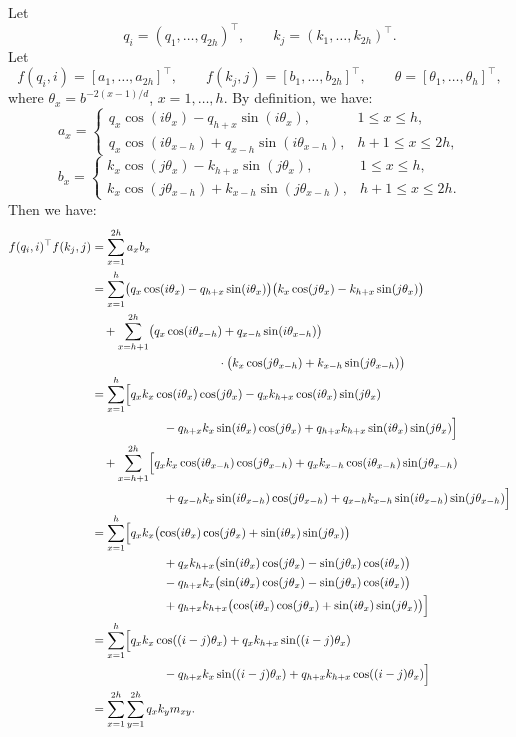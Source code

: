 \documentclass[11pt,a4paper]{article}
\begin{document}
Let
\[
q_i=(q_1,\ldots,q_{2h})^\top,\qquad
k_j=(k_1,\ldots,k_{2h})^\top.
\]
Let
\[
f(q_i,i)=[a_1,\ldots,a_{2h}]^\top,\qquad
f(k_j,j)=[b_1,\ldots,b_{2h}]^\top,\qquad
\theta=[\theta_1,\ldots,\theta_h]^\top,
\]
where \(\theta_x=b^{-2(x-1)/d}\), \(x=1,\ldots,h\).
By definition, we have:
\[
a_x=
\begin{cases}
q_x\cos(i\theta_x)-q_{h+x}\sin(i\theta_x),
& 1\le x\le h,\\
q_x\cos(i\theta_{x-h})+q_{x-h}\sin(i\theta_{x-h}),
& h+1\le x\le 2h,
\end{cases}
\]
\[
b_x=
\begin{cases}
k_x\cos(j\theta_x)-k_{h+x}\sin(j\theta_x),
& 1\le x\le h,\\
k_x\cos(j\theta_{x-h})+k_{x-h}\sin(j\theta_{x-h}),
& h+1\le x\le 2h.
\end{cases}
\]
Then we have:
\begin{align*}
f(q_i,i)^\top f(k_j,j)
&=\sum_{x=1}^{2h}a_xb_x\\
&=\sum_{x=1}^{h}
  \bigl(q_x\cos(i\theta_x)-q_{h+x}\sin(i\theta_x)\bigr)
  \bigl(k_x\cos(j\theta_x)-k_{h+x}\sin(j\theta_x)\bigr)\\
&\quad+\sum_{x=h+1}^{2h}
  \bigl(q_x\cos(i\theta_{x-h})+q_{x-h}\sin(i\theta_{x-h})\bigr)\\
&\hspace{37mm}\cdot
  \bigl(k_x\cos(j\theta_{x-h})+k_{x-h}\sin(j\theta_{x-h})\bigr)\\
&=\sum_{x=1}^{h}\Bigl[
 q_xk_x\cos(i\theta_x)\cos(j\theta_x)
 -q_xk_{h+x}\cos(i\theta_x)\sin(j\theta_x)\\
&\hspace{21mm}
 -q_{h+x}k_x\sin(i\theta_x)\cos(j\theta_x)
 +q_{h+x}k_{h+x}\sin(i\theta_x)\sin(j\theta_x)
 \Bigr]\\
&\quad+\sum_{x=h+1}^{2h}\Bigl[
 q_xk_x\cos(i\theta_{x-h})\cos(j\theta_{x-h})
 +q_xk_{x-h}\cos(i\theta_{x-h})\sin(j\theta_{x-h})\\
&\hspace{21mm}
 +q_{x-h}k_x\sin(i\theta_{x-h})\cos(j\theta_{x-h})
 +q_{x-h}k_{x-h}\sin(i\theta_{x-h})\sin(j\theta_{x-h})
 \Bigr]\\
&=\sum_{x=1}^{h}\Bigl[
 q_xk_x\bigl(\cos(i\theta_x)\cos(j\theta_x)
             +\sin(i\theta_x)\sin(j\theta_x)\bigr)\\
&\hspace{21mm}
 +q_xk_{h+x}\bigl(\sin(i\theta_x)\cos(j\theta_x)
                  -\sin(j\theta_x)\cos(i\theta_x)\bigr)\\
&\hspace{21mm}
 -q_{h+x}k_x\bigl(\sin(i\theta_x)\cos(j\theta_x)
                  -\sin(j\theta_x)\cos(i\theta_x)\bigr)\\
&\hspace{21mm}
 +q_{h+x}k_{h+x}\bigl(\cos(i\theta_x)\cos(j\theta_x)
                      +\sin(i\theta_x)\sin(j\theta_x)\bigr)
 \Bigr]\\
&=\sum_{x=1}^{h}\Bigl[
 q_xk_x\cos((i-j)\theta_x)
 +q_xk_{h+x}\sin((i-j)\theta_x)\\
&\hspace{21mm}
 -q_{h+x}k_x\sin((i-j)\theta_x)
 +q_{h+x}k_{h+x}\cos((i-j)\theta_x)
 \Bigr]\\
&=\sum_{x=1}^{2h}\sum_{y=1}^{2h}q_xk_y m_{xy}.
\end{align*}
\end{document}

